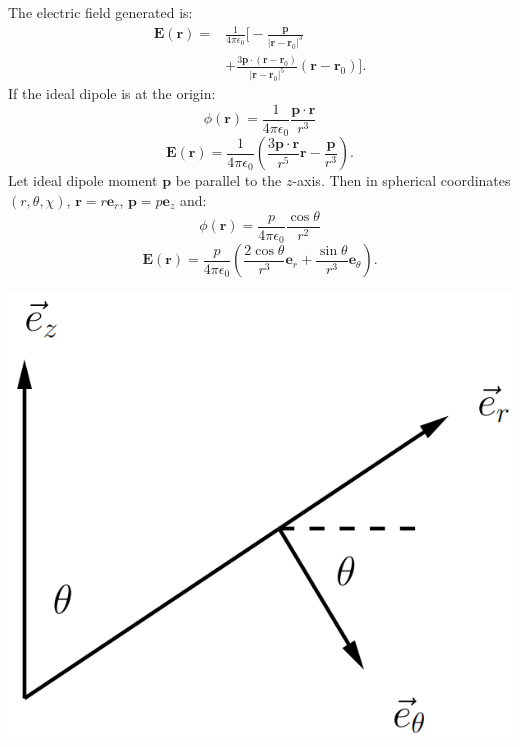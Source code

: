 \documentclass{article}
\newcommand{\vc}[1]{\boldsymbol{#1}}
\begin{document}
\begin{multicols*}{3}
The electric field generated is:
\begin{align*}
    \vc{E}(\vc{r})
    =&\frac{1}{4\pi\epsilon_0}\bigg[
    -\frac{\vc{p}}{|\vc{r}-\vc{r}_0|^3} \\
    &+\frac{3\vc{p}\cdot(\vc{r}-\vc{r}_0)}{|\vc{r}-\vc{r}_0|^5}
    (\vc{r}-\vc{r}_0)\bigg].
\end{align*}
If the ideal dipole is at the origin:
$$\phi(\vc{r})=\frac{1}{4\pi\epsilon_0}
\frac{\vc{p}\cdot\vc{r}}{r^3}$$
$$\vc{E}(\vc{r})=\frac{1}{4\pi\epsilon_0}
\left(\frac{3\vc{p}\cdot\vc{r}}{r^5}\vc{r}
-\frac{\vc{p}}{r^3}\right).$$
Let ideal dipole moment $\vc{p}$ be parallel to the $z$-axis.
Then in spherical coordinates $(r,\theta,\chi)$,
$\vc{r}=r\vc{e}_r$, $\vc{p}=p\vc{e}_z$ and:
$$\phi(\vc{r})=\frac{p}{4\pi\epsilon_0}\frac{\cos\theta}{r^2}$$
$$\vc{E}(\vc{r})=\frac{p}{4\pi\epsilon_0}\left(
\frac{2\cos\theta}{r^3}\vc{e}_r+\frac{\sin\theta}{r^3}
\vc{e}_{\theta}\right).$$
\begin{center}
    \includegraphics[scale=0.22]{f03.png}
\end{center}

\newcolumn


\end{multicols*}
\end{document}

